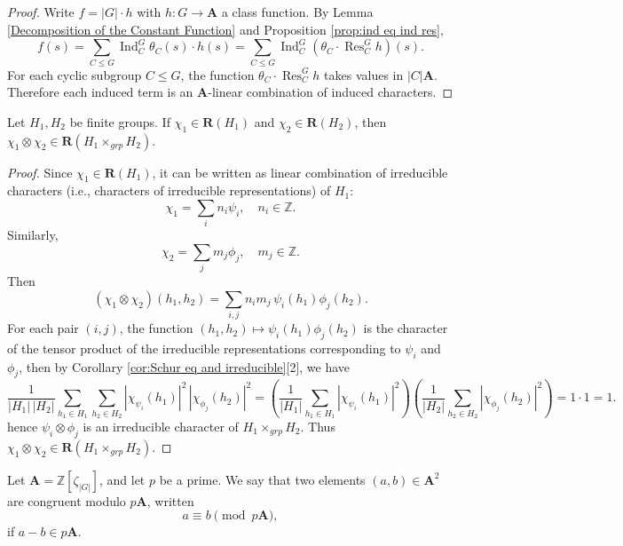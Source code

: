 \begin{proof}
Write \(f = |G| \cdot h\) with \(h: G \to \mathbf{A}\) a class function. By Lemma \ref{Decomposition of the Constant Function} and Proposition \ref{prop:ind eq ind res},
\[
f(s) = \sum_{C \le G} \operatorname{Ind}_C^G \theta_C(s) \cdot h(s)
= \sum_{C \le G} \operatorname{Ind}_C^G (\theta_C \cdot \operatorname{Res}_C^G h)(s).
\]
For each cyclic subgroup \(C\le G\), the function \(\theta_C \cdot \operatorname{Res}_C^G h\) takes values in \(|C|\mathbf{A}\). Therefore each induced term is an \(\mathbf{A}\)-linear combination of induced characters.
\end{proof}
\begin{lemma}\label{tensor product in R}
Let \(H_1, H_2\) be finite groups. If \(\chi_1 \in \mathbf{R}(H_1)\) and \(\chi_2 \in \mathbf{R}(H_2)\), then  \(\chi_1 \otimes \chi_2 \in \mathbf{R}(H_1 \times_{grp} H_2)\).
\end{lemma}

\begin{proof}
Since \(\chi_1 \in \mathbf{R}(H_1)\), it can be written as linear combination of irreducible characters (i.e., characters of irreducible representations) of \(H_1\):
\[
\chi_1 = \sum_i n_i \psi_i, \quad n_i \in \mathbb{Z}.
\]
Similarly,
\[
\chi_2 = \sum_j m_j \phi_j, \quad m_j \in \mathbb{Z}.
\]
Then
\[
(\chi_1 \otimes \chi_2)(h_1, h_2)
= \sum_{i,j} n_i m_j \, \psi_i(h_1) \phi_j(h_2).
\]
For each pair \((i,j)\), the function \((h_1, h_2) \mapsto \psi_i(h_1) \phi_j(h_2)\) is the character of the tensor product of the irreducible representations corresponding to \(\psi_i\) and \(\phi_j\), 
then by Corollary \ref{cor:Schur eq and irreducible}[2], we have\[
\frac{1}{|H_1|\,|H_2|} \sum_{h_1 \in H_1} \sum_{h_2 \in H_2} |\chi_{\psi_i}(h_1)|^2 \, |\chi_{\phi_j}(h_2)|^2
=
\left( \frac{1}{|H_1|} \sum_{h_1 \in H_1} |\chi_{\psi_i}(h_1)|^2 \right)
\left( \frac{1}{|H_2|} \sum_{h_2 \in H_2} |\chi_{\phi_j}(h_2)|^2 \right)
= 1 \cdot 1 = 1.
\]
hence $\psi_i\otimes\phi_j$ is an irreducible character of \(H_1 \times_{grp} H_2\). Thus \(\chi_1 \otimes \chi_2 \in \mathbf{R}(H_1 \times_{grp} H_2)\).
\end{proof}
\begin{defn}
Let \(\mathbf{A} = \mathbb{Z}[\zeta_{|G|}]\), and let \(p\) be a prime. We say that two elements \((a, b) \in \mathbf{A}^2\) are congruent modulo \(p\mathbf{A}\), written
\[
a \equiv b \pmod{p\mathbf{A}},
\]
if \(a - b \in p\mathbf{A}\).
\end{defn}


